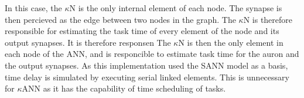 		In this case, the $\kappa$N is the only internal element of each node. The synapse is then percieved as the edge between two nodes in the graph.
		The $\kappa$N is therefore responsible for estimating the task time of every element of the node and its output synapses.
		It is therefore responsen
		The $\kappa$N is then the only element in each node of the ANN, and is responcible to estimate task time for the auron and the output synapses.
		As this implementation used the SANN model as a basis, time delay is simulated by executing serial linked elements.
		This is unnecessary for $\kappa$ANN as it has the capability of time scheduling of tasks.





